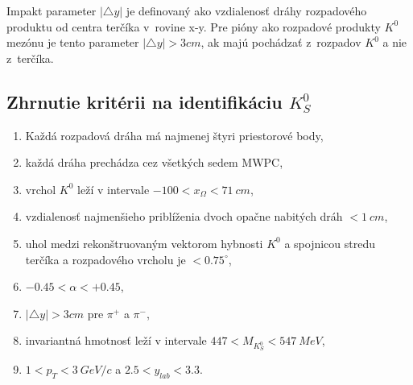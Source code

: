 Impakt parameter $|\triangle y|$ je definovaný ako vzdialenosť dráhy
rozpadového produktu od centra terčíka v~rovine x-y. Pre pióny ako rozpadové
produkty $K^{0}$ mezónu je tento parameter $|\triangle y|>3cm$, ak majú
pochádzať z~rozpadov $K^{0}$ a nie z~terčíka. 

\subsection{Zhrnutie kritérii na identifikáciu $K^{0}_{S}$}
\begin{enumerate}
  \item{Každá rozpadová dráha má najmenej štyri priestorové body,}
  \item{každá dráha prechádza cez všetkých sedem MWPC,}
  \item{vrchol $K^{0}$ leží v intervale $-100<x_{\Omega}<71\: cm$,}
  \item{vzdialenosť najmenšieho priblíženia dvoch opačne nabitých
dráh  
        $<1\: cm$,}
  \item{uhol medzi rekonštruovaným  vektorom hybnosti $K^{0}$ a spojnicou
stredu terčíka a 
        rozpadového vrcholu je  $<0.75^{\circ}$,}
  \item{$ -0.45< \alpha <+0.45$,}  
  \item{$|\triangle y|>3cm$ pre $\pi^{+}$ a $\pi^{-}$,}
  \item{invariantná hmotnosť leží v intervale $447 < M_{K^{0}_{S}} < 547\:
        MeV$,}
  \item{$1<p_{T}<3\: GeV/c$ a $2.5<y_{lab}<3.3$.}
\end{enumerate}
